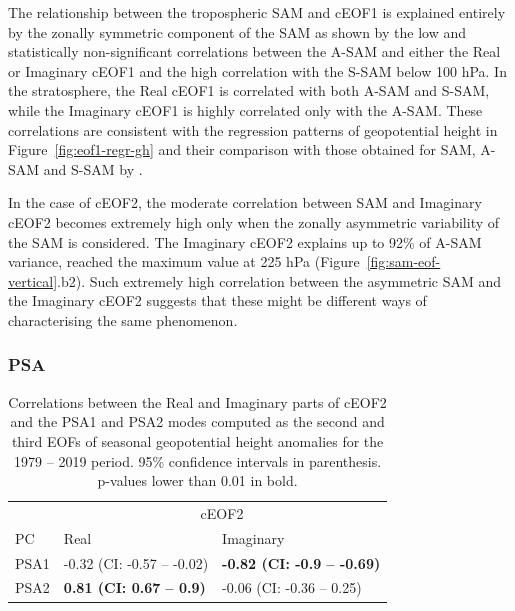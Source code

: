 \documentclass[smallextended]{svjour3}       %
\begin{document}
The relationship between the tropospheric SAM and cEOF1 is explained entirely by the zonally symmetric component of the SAM as shown by the low and statistically non-significant correlations between the A-SAM and either the Real or Imaginary cEOF1 and the high correlation with the S-SAM below 100 hPa.
In the stratosphere, the Real cEOF1 is correlated with both A-SAM and S-SAM, while the Imaginary cEOF1 is highly correlated only with the A-SAM.
These correlations are consistent with the regression patterns of geopotential height in Figure~\ref{fig:eof1-regr-gh} and their comparison with those obtained for SAM, A-SAM and S-SAM by \citet{campitelli2021}.

In the case of cEOF2, the moderate correlation between SAM and Imaginary cEOF2 becomes extremely high only when the zonally asymmetric variability of the SAM is considered.
The Imaginary cEOF2 explains up to 92\% of A-SAM variance, reached the maximum value at 225 hPa (Figure~\ref{fig:sam-eof-vertical}.b2).
Such extremely high correlation between the asymmetric SAM and the Imaginary cEOF2 suggests that these might be different ways of characterising the same phenomenon.

\hypertarget{psa}{%
\subsubsection{PSA}\label{psa}}



\begin{table}

\caption{\label{tab:psa-eof2}Correlations between the Real and Imaginary parts of cEOF2 and the PSA1 and PSA2 modes computed as the second and third EOFs of seasonal geopotential height anomalies \citep[following][]{mo2001} for the 1979 -- 2019 period. 95\% confidence intervals in parenthesis. p-values lower than 0.01 in bold.}
\centering
\begin{tabular}[t]{l>{}l>{}l}
\toprule
\multicolumn{1}{c}{} & \multicolumn{2}{c}{cEOF2} \\
\cmidrule(l{3pt}r{3pt}){2-3}
PC & Real & Imaginary\\
\midrule
PSA1 & -0.32 (CI: -0.57 -- -0.02) & \textbf{-0.82 (CI: -0.9 -- -0.69)}\\
PSA2 & \textbf{0.81 (CI: 0.67 -- 0.9)} & -0.06 (CI: -0.36 -- 0.25)\\
\bottomrule
\end{tabular}
\end{table}
\end{document}
